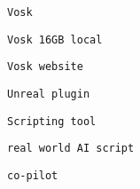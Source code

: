              
             
              \protect\hypertarget{ID_734643947}{}{}

\begin{verbatim}
Vosk
\end{verbatim}

               
               
                \protect\hypertarget{ID_1883262529}{}{}

\begin{verbatim}
Vosk 16GB local
\end{verbatim}
               

               
               
                \protect\hypertarget{ID_1232204300}{}{}

\begin{verbatim}
Vosk website
\end{verbatim}
               

               
               
                \protect\hypertarget{ID_35111077}{}{}

\begin{verbatim}
Unreal plugin
\end{verbatim}
               
             
           

           
           
            \protect\hypertarget{ID_1450067715}{}{}

\begin{verbatim}
Scripting tool
\end{verbatim}

             
             
              \protect\hypertarget{ID_1022107894}{}{}

\begin{verbatim}
real world AI script
\end{verbatim}
             
           

           
           
            \protect\hypertarget{ID_399800902}{}{}

\begin{verbatim}
co-pilot
\end{verbatim}
           

           
           
            \protect\hypertarget{ID_793206223}{}{}

